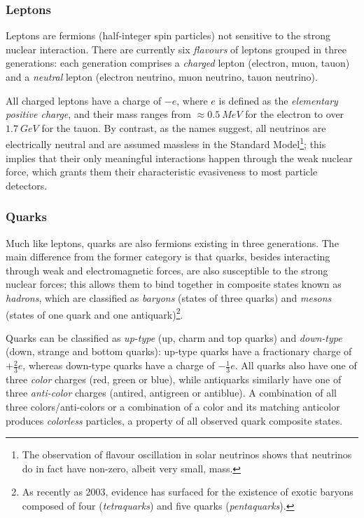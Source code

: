 \subsubsection{Leptons}
Leptons are fermions (half-integer spin particles) not sensitive to the strong nuclear interaction.
There are currently six \textit{flavours} of leptons grouped in three generations: each generation comprises a \textit{charged} lepton (electron, muon, tauon) and a \textit{neutral} lepton (electron neutrino, muon neutrino, tauon neutrino).

All charged leptons have a charge of $-e$, where $e$ is defined as the \textit{elementary positive charge}, and their mass ranges from $\approx \SI{0.5}{MeV}$ for the electron to over $\SI{1.7}{GeV}$ for the tauon.
By contrast, as the names suggest, all neutrinos are electrically neutral and are assumed massless in the Standard Model\footnote{The observation of flavour oscillation in solar neutrinos shows that neutrinos do in fact have non-zero, albeit very small, mass.}; this implies that their only meaningful interactions happen through the weak nuclear force, which grants them their characteristic evasiveness to most particle detectors.


\subsubsection{Quarks}
Much like leptons, quarks are also fermions existing in three generations. The main difference from the former category is that quarks, besides interacting through weak and electromagnetic forces, are also susceptible to the strong nuclear forces; this allows them to bind together in composite states known as \textit{hadrons}, which are classified as \textit{baryons} (states of three quarks) and \textit{mesons} (states of one quark and one antiquark)\footnote{As recently as 2003, evidence has surfaced for the existence of exotic baryons composed of four (\textit{tetraquarks}) and five quarks (\textit{pentaquarks}).}.

Quarks can be classified as \textit{up-type} (up, charm and top quarks) and \textit{down-type} (down, strange and bottom quarks): up-type quarks have a fractionary charge of $+\frac{2}{3} e$, whereas down-type quarks have a charge of $-\frac{1}{3} e$. All quarks also have one of three \textit{color} charges (red, green or blue), while antiquarks similarly have one of three \textit{anti-color} charges (antired, antigreen or antiblue). A combination of all three colors/anti-colors or a combination of a color and its matching anticolor produces \textit{colorless} particles, a property of all observed quark composite states.

